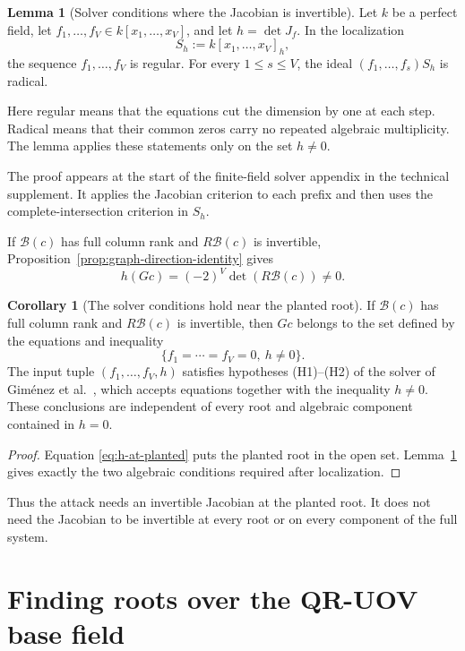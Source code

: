 \documentclass[11pt,a4paper]{article}
\theoremstyle{definition}
\newtheorem{lemma}[theorem]{Lemma}
\newtheorem{corollary}[theorem]{Corollary}
\theoremstyle{remark}
\begin{document}
\begin{lemma}[Solver conditions where the Jacobian is invertible]\label{lem:jacobian-localization}
Let $k$ be a perfect field, let $f_1,\ldots,f_V\in k[x_1,\ldots,x_V]$, and let $h=\det J_f$.  In the localization
\[
 S_h:=k[x_1,\ldots,x_V]_h,
\]
the sequence $f_1,\ldots,f_V$ is regular.  For every $1\le s\le V$, the ideal $(f_1,\ldots,f_s)S_h$ is radical.
\end{lemma}

Here regular means that the equations cut the dimension by one at each step.
Radical means that their common zeros carry no repeated algebraic
multiplicity.  The lemma applies these statements only on the set $h\ne0$.

The proof appears at the start of the finite-field solver appendix in the
technical supplement.  It applies the Jacobian criterion to each prefix and
then uses the complete-intersection criterion in $S_h$.

If $\mathcal B(c)$ has full column rank and $R\mathcal B(c)$ is invertible,
Proposition~\ref{prop:graph-direction-identity} gives
\begin{equation}\label{eq:h-at-planted}
 h(Gc)=(-2)^V\det(R\mathcal B(c))\ne0.
\end{equation}

\begin{corollary}[The solver conditions hold near the planted root]\label{cor:local-hypotheses}
If $\mathcal B(c)$ has full column rank and $R\mathcal B(c)$ is invertible,
then $Gc$ belongs to the set defined by the equations and inequality
\[
 \{f_1=\cdots=f_V=0,\ h\ne0\}.
\]
The input tuple $(f_1,\ldots,f_V,h)$ satisfies hypotheses (H1)--(H2) of the
solver of Gim\'enez et al.~\cite{Gimenez2026}, which accepts equations together
with the inequality $h\ne0$.  These conclusions are independent of every root
and algebraic component contained in $h=0$.
\end{corollary}

\begin{proof}
Equation \eqref{eq:h-at-planted} puts the planted root in the open set.
Lemma~\ref{lem:jacobian-localization} gives exactly the two algebraic
conditions required after localization.
\end{proof}

Thus the attack needs an invertible Jacobian at the planted root.  It does not
need the Jacobian to be invertible at every root or on every component of the
full system.


\section{Finding roots over the QR-UOV base field}\label{sec:finite-char-solver}
\end{document}
